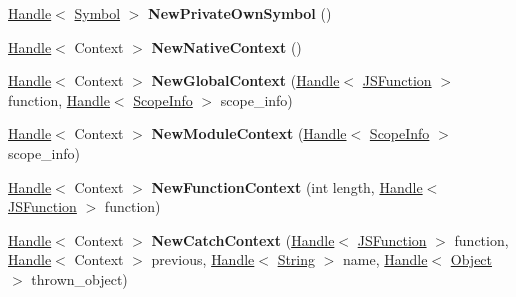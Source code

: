 \begin{DoxyCompactItemize}
\item 
\hypertarget{classv8_1_1internal_1_1_v8___f_i_n_a_l_a8c893bf9d7fa34ed0018eba6e5de9b55}{}\hyperlink{classv8_1_1internal_1_1_handle}{Handle}$<$ \hyperlink{classv8_1_1internal_1_1_symbol}{Symbol} $>$ {\bfseries New\+Private\+Own\+Symbol} ()\label{classv8_1_1internal_1_1_v8___f_i_n_a_l_a8c893bf9d7fa34ed0018eba6e5de9b55}

\item 
\hypertarget{classv8_1_1internal_1_1_v8___f_i_n_a_l_a4898deb1bb72ed66c880b1fa555f2039}{}\hyperlink{classv8_1_1internal_1_1_handle}{Handle}$<$ Context $>$ {\bfseries New\+Native\+Context} ()\label{classv8_1_1internal_1_1_v8___f_i_n_a_l_a4898deb1bb72ed66c880b1fa555f2039}

\item 
\hypertarget{classv8_1_1internal_1_1_v8___f_i_n_a_l_af6499485cb66ad69d853964de5607c18}{}\hyperlink{classv8_1_1internal_1_1_handle}{Handle}$<$ Context $>$ {\bfseries New\+Global\+Context} (\hyperlink{classv8_1_1internal_1_1_handle}{Handle}$<$ \hyperlink{classv8_1_1internal_1_1_j_s_function}{J\+S\+Function} $>$ function, \hyperlink{classv8_1_1internal_1_1_handle}{Handle}$<$ \hyperlink{classv8_1_1internal_1_1_scope_info}{Scope\+Info} $>$ scope\+\_\+info)\label{classv8_1_1internal_1_1_v8___f_i_n_a_l_af6499485cb66ad69d853964de5607c18}

\item 
\hypertarget{classv8_1_1internal_1_1_v8___f_i_n_a_l_a002c60b52c247852bec89690ff6b6dc5}{}\hyperlink{classv8_1_1internal_1_1_handle}{Handle}$<$ Context $>$ {\bfseries New\+Module\+Context} (\hyperlink{classv8_1_1internal_1_1_handle}{Handle}$<$ \hyperlink{classv8_1_1internal_1_1_scope_info}{Scope\+Info} $>$ scope\+\_\+info)\label{classv8_1_1internal_1_1_v8___f_i_n_a_l_a002c60b52c247852bec89690ff6b6dc5}

\item 
\hypertarget{classv8_1_1internal_1_1_v8___f_i_n_a_l_ab06ff1f273116de8da54c359352b5559}{}\hyperlink{classv8_1_1internal_1_1_handle}{Handle}$<$ Context $>$ {\bfseries New\+Function\+Context} (int length, \hyperlink{classv8_1_1internal_1_1_handle}{Handle}$<$ \hyperlink{classv8_1_1internal_1_1_j_s_function}{J\+S\+Function} $>$ function)\label{classv8_1_1internal_1_1_v8___f_i_n_a_l_ab06ff1f273116de8da54c359352b5559}

\item 
\hypertarget{classv8_1_1internal_1_1_v8___f_i_n_a_l_a86eebc66dee625933d5856ccf9ca7564}{}\hyperlink{classv8_1_1internal_1_1_handle}{Handle}$<$ Context $>$ {\bfseries New\+Catch\+Context} (\hyperlink{classv8_1_1internal_1_1_handle}{Handle}$<$ \hyperlink{classv8_1_1internal_1_1_j_s_function}{J\+S\+Function} $>$ function, \hyperlink{classv8_1_1internal_1_1_handle}{Handle}$<$ Context $>$ previous, \hyperlink{classv8_1_1internal_1_1_handle}{Handle}$<$ \hyperlink{classv8_1_1internal_1_1_string}{String} $>$ name, \hyperlink{classv8_1_1internal_1_1_handle}{Handle}$<$ \hyperlink{classv8_1_1internal_1_1_object}{Object} $>$ thrown\+\_\+object)\label{classv8_1_1internal_1_1_v8___f_i_n_a_l_a86eebc66dee625933d5856ccf9ca7564}


\end{DoxyCompactItemize}
